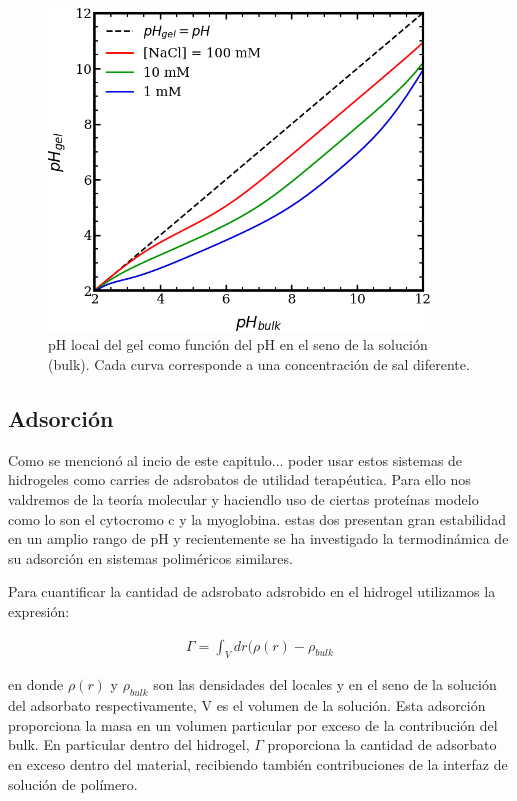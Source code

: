 \begin{figure}
    \centering
    \includegraphics[width=0.9\textwidth]{Figures/graph-film/pH-local.png}
    \caption{pH local del gel como funci\'on del pH en el seno de la soluci\'on (bulk). Cada curva corresponde a una concentraci\'on de sal diferente.}
    \label{fig:pH-local}
\end{figure}

\subsection{Adsorci\'on}
Como se mencion\'o al incio de este capitulo... poder usar estos sistemas de hidrogeles como carries de adsrobatos de utilidad terap\'eutica.
Para ello nos valdremos de la teor\'ia molecular y haciendlo uso de ciertas prote\'inas modelo como lo son el cytocromo c y la myoglobina. estas dos presentan gran estabilidad en un amplio rango de pH y recientemente se ha  investigado la termodinámica  de su adsorci\'on en sistemas polim\'ericos similares. \addcite

Para cuantificar la cantidad de adsrobato adsrobido en el hidrogel utilizamos la expresi\'on:

\begin{align}
\Gamma = \int_V {dr(\rho(r) -\rho_{bulk}}  
\label{adsor}
\end{align}

en donde $\rho(r)$ y $\rho_{bulk}$ son las densidades del  locales y en el seno de la soluci\'on del adsorbato respectivamente, V es el volumen de la soluci\'on. 
Esta adsorci\'on proporciona la masa  en un volumen particular por exceso de la contribuci\'on del bulk. En particular dentro del hidrogel, $\Gamma$ proporciona la cantidad de adsorbato en exceso dentro del material, recibiendo tambi\'en contribuciones de la interfaz de soluci\'on de pol\'imero.

